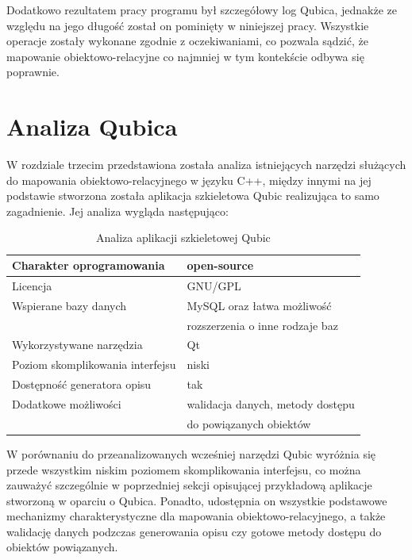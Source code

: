 \documentclass[12pt]{report}
\begin{document}


Dodatkowo rezultatem pracy programu był szczegółowy log Qubica, jednakże ze względu na jego długość został on pominięty w niniejszej pracy. Wszystkie operacje zostały
wykonane zgodnie z oczekiwaniami, co pozwala sądzić, że mapowanie obiektowo-relacyjne co najmniej w tym kontekście odbywa się poprawnie.

\section{Analiza Qubica}

W rozdziale trzecim przedstawiona została analiza istniejących narzędzi służących do mapowania obiektowo-relacyjnego w języku C++, między innymi na jej podstawie
stworzona została aplikacja szkieletowa Qubic realizująca to samo zagadnienie. Jej analiza wygląda następująco:

\begin{table}[h]
\centering
\begin{tabular}{| l | l |} 
\hline 
Charakter oprogramowania & open-source \\ \hline
Licencja & GNU/GPL  \\ \hline
Wspierane bazy danych & MySQL oraz łatwa możliwość \\ \hline
&  rozszerzenia o inne rodzaje baz \\ \hline
Wykorzystywane narzędzia & Qt  \\ \hline
Poziom skomplikowania interfejsu & niski  \\ \hline
Dostępność generatora opisu & tak  \\ \hline
Dodatkowe możliwości &  walidacja danych, metody dostępu  \\ \hline
& do powiązanych obiektów \\ \hline
\end{tabular} 
\caption{Analiza aplikacji szkieletowej Qubic}
\end{table}

W porównaniu do przeanalizowanych wcześniej narzędzi Qubic wyróżnia się przede wszystkim niskim poziomem skomplikowania interfejsu, co można zauważyć szczególnie w
poprzedniej sekcji opisującej przykładową aplikacje stworzoną w oparciu o Qubica. Ponadto, udostępnia on wszystkie podstawowe mechanizmy charakterystyczne dla mapowania
obiektowo-relacyjnego, a także walidację danych podzczas generowania opisu czy gotowe metody dostępu do obiektów powiązanych. 
\end{document}
